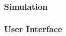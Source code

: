 \documentclass[../main.tex]{subfiles}
\begin{document}
\subsubsection{Simulation}

\lipsum[5]

\subsubsection{User Interface}

\lipsum[9]
\end{document}
